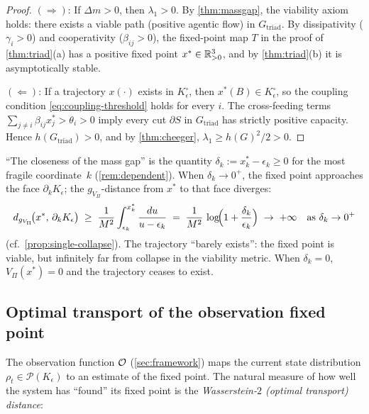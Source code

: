 \begin{proof}
$(\Rightarrow)$: If $\Delta m > 0$, then $\lambda_1 > 0$.
By \cref{thm:massgap}, the viability axiom holds: there exists a
viable path (positive agentic flow) in $G_{\mathrm{triad}}$.
By dissipativity ($\gamma_i > 0$) and cooperativity
($\beta_{ij} > 0$), the fixed-point map $T$ in the proof of
\cref{thm:triad}(a) has a positive fixed point
$x^* \in \mathbb{R}^3_{>0}$, and by \cref{thm:triad}(b) it is
asymptotically stable.

$(\Leftarrow)$: If a trajectory $x(\cdot)$ exists in
$K_\epsilon^\circ$, then $x^*(B) \in K_\epsilon^\circ$, so the
coupling condition \eqref{eq:coupling-threshold} holds for every
$i$.  The cross-feeding terms $\sum_{j \neq i}\beta_{ij}x_j^* >
\theta_i > 0$ imply every cut $\partial S$ in
$G_{\mathrm{triad}}$ has strictly positive capacity.
Hence $h(G_{\mathrm{triad}}) > 0$, and by \cref{thm:cheeger},
$\lambda_1 \geq h(G)^2/2 > 0$.
\end{proof}

\begin{remark}\label{rem:gap-closeness}
``The closeness of the mass gap'' is the quantity
$\delta_k := x_k^* - \epsilon_k \geq 0$ for the most fragile
coordinate~$k$ (\cref{rem:dependent}).
When $\delta_k \to 0^+$, the fixed point approaches the face
$\partial_k K_\epsilon$; the $g_{V_\Pi}$-distance from $x^*$ to
that face diverges:
\[
  d_{g_{V_\Pi}}\!\bigl(x^*,\, \partial_k K_\epsilon\bigr)
  \;\geq\;
  \frac{1}{M^2} \int_{\epsilon_k}^{x_k^*}
  \frac{du}{u - \epsilon_k}
  \;=\;
  \frac{1}{M^2}\,\log\!\Bigl(1 + \frac{\delta_k}{\epsilon_k}\Bigr)
  \;\to\; +\infty
  \quad\text{as }\delta_k \to 0^+
\]
(cf.\ \cref{prop:single-collapse}).
The trajectory ``barely exists'': the fixed point is viable, but
infinitely far from collapse in the viability metric.
When $\delta_k = 0$, $V_\Pi(x^*) = 0$ and the trajectory ceases
to exist.
\end{remark}

\subsection{Optimal transport of the observation fixed point}

The observation function $\mathcal{O}$ (\cref{sec:framework}) maps the
current state distribution $\rho_t \in \mathcal{P}(K_\epsilon)$
to an estimate of the fixed point.  The natural measure of how
well the system has ``found'' its fixed point is the
\emph{Wasserstein-$2$ (optimal transport) distance}:

